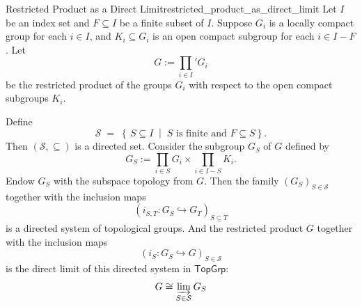 \documentclass{report}
\begin{document}
\begin{proposition}{Restricted Product as a Direct Limit}{restricted_product_as_direct_limit}
	Let \( I \) be an index set and \( F\subseteq I \) be a finite subset of \( I \). Suppose \( G_i \) is a locally compact group for each \( i \in I \), and \( K_i \subseteq G_i \) is an open compact subgroup for each \( i \in I - F \). Let
	\[
	G:=\prod_{i\in I}' G_i
	\]
	be the restricted product of the groups \( G_i \) with respect to the open compact subgroups \( K_i \).

	Define 
	\[
		\mathcal S \;=\;\left\{\,S\subseteq I \;\middle| \;
						S \text{ is finite and } F\subseteq S\right\}.
	\]
	Then $(\mathcal S, \subseteq)$ is a directed set. 
	Consider the subgroup $G_S$ of $G$ defined by
	\[
		G_S:=\prod_{i\in S} G_i \times \prod_{i\in I-S} K_i.
	\]
	Endow $G_S$ with the subspace topology from $G$. Then the family $\left( G_S \right)_{S\in \mathcal S}$ together with
the inclusion maps 
    \[
		\left(i_{S,T}:G_S\hookrightarrow G_T\right)_{S\subseteq T}
	\]
	is a directed system of topological groups. And the restricted product \( G \) together with the inclusion maps 
	\[
		\left(i_S:G_S\hookrightarrow G\right)_{S\in \mathcal S}
	\]
	is the direct limit of this directed system in $\mathsf{TopGrp}$:
	\[		
	G \cong \varinjlim_{S\in \mathcal S} G_S
	\]
\end{proposition}
\end{document}
